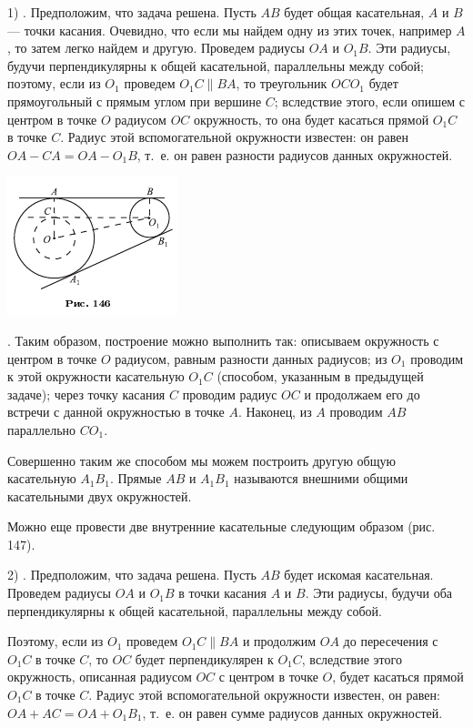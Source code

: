 \documentclass[oneside]{book}
\begin{document}
1) .
Предположим, что задача решена.
Пусть $AB$ будет общая касательная, $A$ и $B$ — точки касания.
Очевидно, что если мы найдем одну из этих точек, например $A$, то затем легко найдем и другую.
Проведем радиусы $OA$ и $O_1B$.
Эти радиусы, будучи перпендикулярны к общей касательной, параллельны между собой;
поэтому, если из $O_1$ проведем $O_1C\parallel BA$, то треугольник $OCO_1$ будет прямоугольный с прямым углом при вершине $C$;
вследствие этого, если опишем с центром в точке $O$ радиусом $OC$ окружность, то она будет касаться прямой $O_1C$ в точке $C$.
Радиус этой вспомогательной окружности известен:
он равен $OA-CA=OA-O_1B$, т.~е.
он равен разности радиусов данных окружностей.

\includegraphics{pics/ris-146}

.
Таким образом, построение можно выполнить так:
описываем окружность с центром в точке $O$ радиусом, равным разности данных радиусов;
из $O_1$ проводим к этой окружности касательную $O_1C$ (способом, указанным в предыдущей задаче);
через точку касания $C$ проводим радиус $OC$ и продолжаем его до встречи с данной окружностью в точке $A$.
Наконец, из $A$ проводим $AB$ параллельно $CO_1$.

Совершенно таким же способом мы можем построить другую общую касательную $A_1B_1$.
Прямые $AB$ и $A_1B_1$ называются внешними общими касательными двух окружностей.

Можно еще провести две внутренние касательные следующим образом (рис. 147).

2) .
Предположим, что задача решена.
Пусть $AB$ будет искомая касательная.
Проведем радиусы $OA$ и $O_1B$ в точки касания $A$ и $B$.
Эти радиусы, будучи оба перпендикулярны к общей касательной, параллельны между собой.

Поэтому, если из $O_1$ проведем $O_1C\parallel BA$ и продолжим $OA$ до пересечения с $O_1C$ в точке $C$, то $OC$ будет перпендикулярен к $O_1C$, вследствие этого окружность, описанная радиусом $OC$ с центром в точке $O$, будет касаться прямой $O_1C$ в точке $C$.
Радиус этой вспомогательной окружности известен, он равен:
$OA+AC=OA+O_1B_1$, т.~е.
он равен сумме радиусов данных окружностей.
\end{document}
